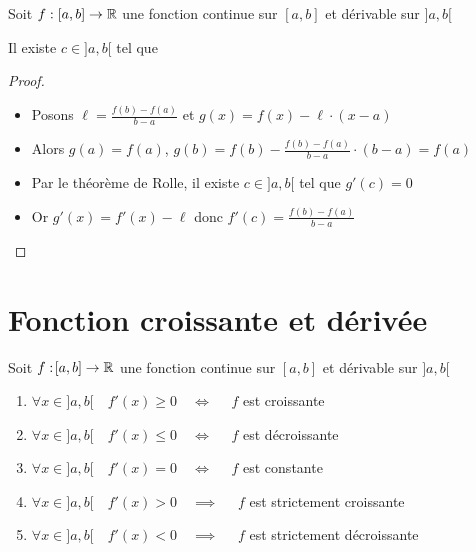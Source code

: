 \begin{frame}

\begin{theoreme}
Soit $f:[a,b] \to \mathbb{R}$ une fonction continue sur $[a,b]$ et dérivable sur $]a,b[$

Il existe $c\in]a,b[$ tel que 
\end{theoreme}


\begin{proof}
\pause
\begin{itemize}
  \item Posons $\ell = \frac{f(b)-f(a)}{b-a}$ et $g(x) = f(x) - \ell \cdot (x-a)$
\pause
  \item Alors $g(a)=f(a)$, \quad \pause $g(b)=f(b)- \frac{f(b)-f(a)}{b-a} \cdot (b-a) = f(a)$
\pause
  \item Par le théorème de Rolle, il existe $c \in ]a,b[$ tel que $g'(c) =0$
\pause
  \item Or $g'(x) = f'(x) - \ell$ \pause donc $f'(c)= \frac{f(b)-f(a)}{b-a}$
\end{itemize}

\end{proof}
\end{frame}



\section*{Fonction croissante et dérivée}


\begin{frame}

\begin{corollaire}
Soit $f:\![a,b] \to \mathbb{R}$ une fonction continue sur $[a,b]$ et dérivable sur $]a,b[$
\pause
\begin{enumerate}[<+->]
\setlength{\itemsep}{5pt} 
  \item $\forall x \in ]a,b[ \quad f'(x) \ge 0 \quad \iff \quad$ $f$ est croissante 
  \item $\forall x \in ]a,b[ \quad f'(x) \le 0 \quad \iff \quad$ $f$ est décroissante 
  \item $\forall x \in ]a,b[ \quad f'(x) = 0 \quad \iff \quad$ $f$ est constante 
  \item $\forall x \in ]a,b[ \quad f'(x) > 0 \quad \implies \quad$ $f$ est strictement croissante 
  \item $\forall x \in ]a,b[ \quad f'(x) < 0 \quad \implies \quad$ $f$ est strictement décroissante
\end{enumerate}
\end{corollaire}
\end{frame}



